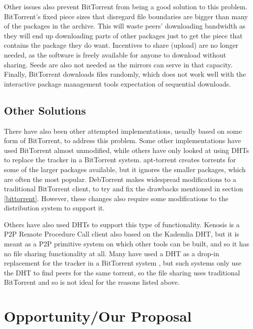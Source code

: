 \documentclass[conference]{IEEEtran}
\begin{document}
Other issues also prevent BitTorrent from being a good solution to
this problem. BitTorrent's fixed piece sizes that disregard file
boundaries are bigger than many of the packages in the archive. This
will waste peers' downloading bandwidth as they will end up
downloading parts of other packages just to get the piece that
contains the package they do want. Incentives to share (upload) are
no longer needed, as the software is freely available for anyone to
download without sharing. Seeds are also not needed as the mirrors
can serve in that capacity. Finally, BitTorrent downloads files
randomly, which does not work well with the interactive package
management tools expectation of sequential downloads.

\subsection{Other Solutions}
\label{others}

There have also been other attempted implementations, usually based
on some form of BitTorrent, to address this problem. Some other
implementations have used BitTorrent almost unmodified, while others
have only looked at using DHTs to replace the tracker in a
BitTorrent system. apt-torrent \cite{apttorrent} creates torrents
for some of the larger packages available, but it ignores the
smaller packages, which are often the most popular. DebTorrent
\cite{debtorrent} makes widespread modifications to a traditional
BitTorrent client, to try and fix the drawbacks mentioned in section
\ref{bittorrent}. However, these changes also require some
modifications to the distribution system to support it.

Others have also used DHTs to support this type of functionality.
Kenosis \cite{kenosis} is a P2P Remote Procedure Call
client also based on the Kademlia DHT, but it is meant as a P2P
primitive system on which other tools can be built, and so it has no
file sharing functionality at all. Many have used a DHT as a drop-in
replacement for the tracker in a BitTorrent system
\cite{bittorrent-dht, azureus-dht}, but such systems only use the
DHT to find peers for the same torrent, so the file sharing uses
traditional BitTorrent and so is not ideal for the reasons listed
above.


\section{Opportunity/Our Proposal}
\label{opportunity}
\end{document}
